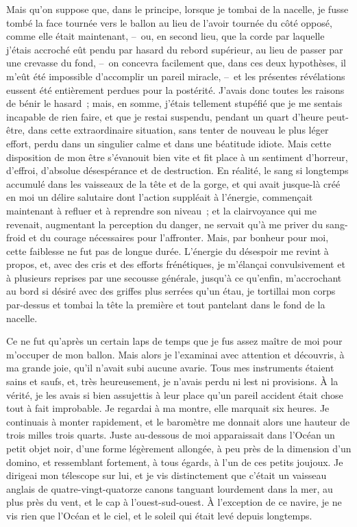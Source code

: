 \documentclass[french,twoside]{book} %
\begin{document}
Mais qu’on suppose que, dans le principe, lorsque je tombai de la nacelle, je fusse tombé la face tournée vers le ballon au lieu de l’avoir tournée du côté opposé, comme elle était maintenant, – ou, en second lieu, que la corde par laquelle j’étais accroché eût pendu par hasard du rebord supérieur, au lieu de passer par une crevasse du fond, – on concevra facilement que, dans ces deux hypothèses, il m’eût été impossible d’accomplir un pareil miracle, – et les présentes révélations eussent été entièrement perdues pour la postérité. J’avais donc toutes les raisons de bénir le hasard ; mais, en somme, j’étais tellement stupéfié que je me sentais incapable de rien faire, et que je restai suspendu, pendant un quart d’heure peut-être, dans cette extraordinaire situation, sans tenter de nouveau le plus léger effort, perdu dans un singulier calme et dans une béatitude idiote. Mais cette disposition de mon être s’évanouit bien vite et fit place à un sentiment d’horreur, d’effroi, d’absolue désespérance et de destruction. En réalité, le sang si longtemps accumulé dans les vaisseaux de la tête et de la gorge, et qui avait jusque-là créé en moi un délire salutaire dont l’action suppléait à l’énergie, commençait maintenant à refluer et à reprendre son niveau ; et la clairvoyance qui me revenait, augmentant la perception du danger, ne servait qu’à me priver du sang-froid et du courage nécessaires pour l’affronter. Mais, par bonheur pour moi, cette faiblesse ne fut pas de longue durée. L’énergie du désespoir me revint à propos, et, avec des cris et des efforts frénétiques, je m’élançai convulsivement et à plusieurs reprises par une secousse générale, jusqu’à ce qu’enfin, m’accrochant au bord si désiré avec des griffes plus serrées qu’un étau, je tortillai mon corps par-dessus et tombai la tête la première et tout pantelant dans le fond de la nacelle.\par
Ce ne fut qu’après un certain laps de temps que je fus assez maître de moi pour m’occuper de mon ballon. Mais alors je l’examinai avec attention et découvris, à ma grande joie, qu’il n’avait subi aucune avarie. Tous mes instruments étaient sains et saufs, et, très heureusement, je n’avais perdu ni lest ni provisions. À la vérité, je les avais si bien assujettis à leur place qu’un pareil accident était chose tout à fait improbable. Je regardai à ma montre, elle marquait six heures. Je continuais à monter rapidement, et le baromètre me donnait alors une hauteur de trois milles trois quarts. Juste au-dessous de moi apparaissait dans l’Océan un petit objet noir, d’une forme légèrement allongée, à peu près de la dimension d’un domino, et ressemblant fortement, à tous égards, à l’un de ces petits joujoux. Je dirigeai mon télescope sur lui, et je vis distinctement que c’était un vaisseau anglais de quatre-vingt-quatorze canons tanguant lourdement dans la mer, au plus près du vent, et le cap à l’ouest-sud-ouest. À l’exception de ce navire, je ne vis rien que l’Océan et le ciel, et le soleil qui était levé depuis longtemps.\par
\end{document}
